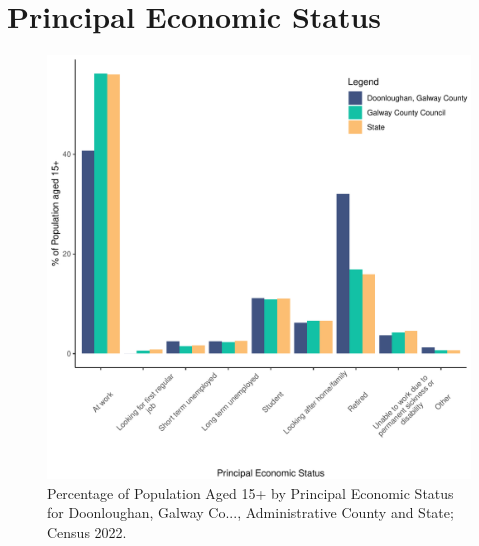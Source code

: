\documentclass{article}
\begin{document}
  
\pagebreak
\section{Principal Economic Status}\label{sect:PES}
\begin{figure}[H]
	\centering
	\includegraphics[width = 140mm]{../figures/PESED.pdf}
	\caption{Percentage of Population Aged 15+ by Principal Economic Status for Doonloughan, Galway Co..., Administrative County and State; Census 2022.}
	\label{fig:vbnv}
	\end{figure}
\end{document}
